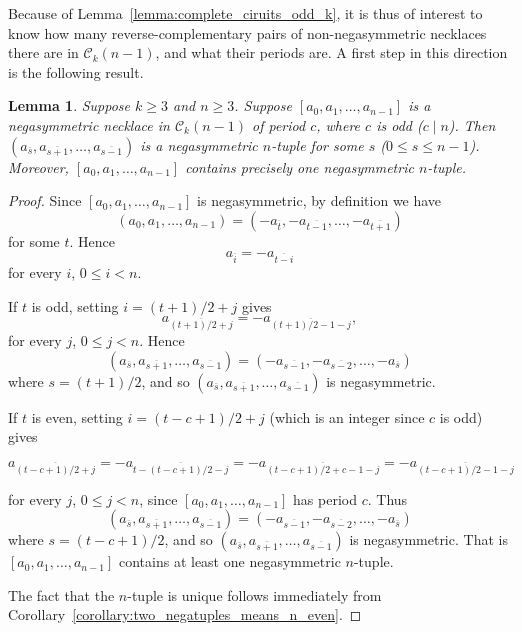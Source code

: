 \documentclass[a4paper,11pt]{article}
\theoremstyle{plain}
\newtheorem{lemma}{Lemma}[section]
\theoremstyle{definition}
\theoremstyle{remark}
\begin{document}
Because of Lemma~\ref{lemma:complete_ciruits_odd_k}, it is thus of interest to know how many
reverse-complementary pairs of non-negasymmetric necklaces there are in $\mathcal{C}_k(n-1)$, and
what their periods are.  A first step in this direction is the following result.

\begin{lemma}  \label{lemma:nega_ciruit_means_nega_tuple_odd_k_odd_c}
Suppose $k\geq3$ and $n\geq 3$.  Suppose $[a_0,a_1,\dots,a_{n-1}]$ is a negasymmetric necklace in
$\mathcal{C}_k(n-1)$ of period $c$, where $c$ is odd ($c\mid n$).  Then
$(a_{\overline{s}},a_{\overline{s+1}},\dots,a_{\overline{s-1}})$ is a negasymmetric $n$-tuple for
some $s$ ($0\leq s\leq n-1$).  Moreover, $[a_0,a_1,\dots,a_{n-1}]$ contains precisely one
negasymmetric $n$-tuple.
\end{lemma}

\begin{proof}
Since $[a_0,a_1,\dots,a_{n-1}]$ is negasymmetric, by definition we have
\[ (a_0,a_1,\dots,a_{n-1}) = (-a_{\overline{t}},-a_{\overline{t-1}},\dots,-a_{\overline{t+1}}) \]
for some $t$.  Hence
\[ a_{\overline{i}}=-a_{\overline{t-i}} \]
for every $i$, $0\leq i<n$.

If $t$ is odd, setting $i=(t+1)/2+j$ gives
\[ a_{\overline{(t+1)/2+j}}=-a_{\overline{(t+1)/2-1-j}}, \]
for every $j$, $0\leq j<n$.  Hence
\[ (a_{\overline{s}},a_{\overline{s+1}},\dots,a_{\overline{s-1}}) =
(-a_{\overline{s-1}},-a_{\overline{s-2}},\dots,-a_{\overline{s}}) \]
where $s=(t+1)/2$, and so $(a_{\overline{s}},a_{\overline{s+1}},\dots,a_{\overline{s-1}})$ is
negasymmetric.

If $t$ is even, setting $i=(t-c+1)/2+j$ (which is an integer since $c$ is odd) gives

\[ a_{\overline{(t-c+1)/2+j}}=-a_{\overline{t-(t-c+1)/2-j}}=
-a_{\overline{(t-c+1)/2+c-1-j}}= -a_{\overline{(t-c+1)/2-1-j}}\]

for every $j$, $0\leq j<n$, since $[a_0,a_1,\dots,a_{n-1}]$ has period $c$. Thus
\[ (a_{\overline{s}},a_{\overline{s+1}},\dots,a_{\overline{s-1}}) =
(-a_{\overline{s-1}},-a_{\overline{s-2}},\dots,-a_{\overline{s}}) \] where $s=(t-c+1)/2$, and so
$(a_{\overline{s}},a_{\overline{s+1}},\dots,a_{\overline{s-1}})$ is negasymmetric.  That is
$[a_0,a_1,\dots,a_{n-1}]$ contains at least one negasymmetric $n$-tuple.

The fact that the $n$-tuple is unique follows immediately from
Corollary~\ref{corollary:two_negatuples_means_n_even}.
\end{proof}
\end{document}
